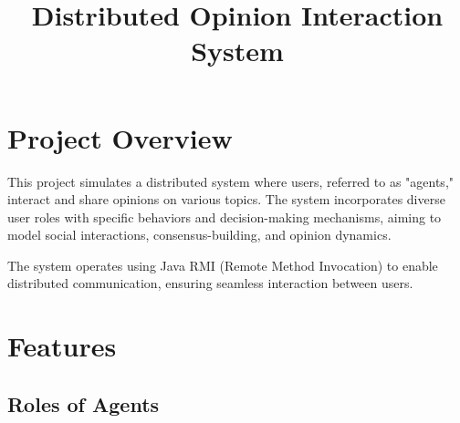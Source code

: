\documentclass[a4paper,12pt]{article}
\title{Distributed Opinion Interaction System}
\author{}
\date{}
\begin{document}
\maketitle

\section*{Project Overview}
This project simulates a distributed system where users, referred to as "agents," interact and share opinions on various topics. The system incorporates diverse user roles with specific behaviors and decision-making mechanisms, aiming to model social interactions, consensus-building, and opinion dynamics.

The system operates using Java RMI (Remote Method Invocation) to enable distributed communication, ensuring seamless interaction between users.

\section*{Features}

\subsection*{Roles of Agents}
\end{document}
